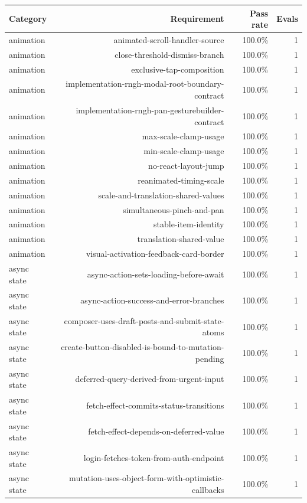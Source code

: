 \begin{table}[htbp]
\centering
\begin{tabular}{lrrr}
\toprule
Category & Requirement & Pass rate & Evals \\
\midrule
animation & animated-scroll-handler-source & 100.0\% & 1 \\
animation & close-threshold-dismiss-branch & 100.0\% & 1 \\
animation & exclusive-tap-composition & 100.0\% & 1 \\
animation & implementation-rngh-modal-root-boundary-contract & 100.0\% & 1 \\
animation & implementation-rngh-pan-gesturebuilder-contract & 100.0\% & 1 \\
animation & max-scale-clamp-usage & 100.0\% & 1 \\
animation & min-scale-clamp-usage & 100.0\% & 1 \\
animation & no-react-layout-jump & 100.0\% & 1 \\
animation & reanimated-timing-scale & 100.0\% & 1 \\
animation & scale-and-translation-shared-values & 100.0\% & 1 \\
animation & simultaneous-pinch-and-pan & 100.0\% & 1 \\
animation & stable-item-identity & 100.0\% & 1 \\
animation & translation-shared-value & 100.0\% & 1 \\
animation & visual-activation-feedback-card-border & 100.0\% & 1 \\
async state & async-action-sets-loading-before-await & 100.0\% & 1 \\
async state & async-action-success-and-error-branches & 100.0\% & 1 \\
async state & composer-uses-draft-posts-and-submit-state-atoms & 100.0\% & 1 \\
async state & create-button-disabled-is-bound-to-mutation-pending & 100.0\% & 1 \\
async state & deferred-query-derived-from-urgent-input & 100.0\% & 1 \\
async state & fetch-effect-commits-status-transitions & 100.0\% & 1 \\
async state & fetch-effect-depends-on-deferred-value & 100.0\% & 1 \\
async state & login-fetches-token-from-auth-endpoint & 100.0\% & 1 \\
async state & mutation-uses-object-form-with-optimistic-callbacks & 100.0\% & 1 \\

\end{tabular}
\end{table}

